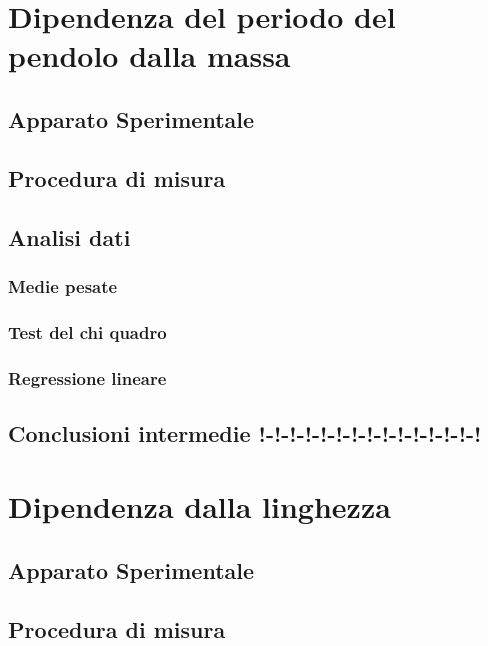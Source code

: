 \documentclass[11pt, twoside, a4paper]{article}
\begin{document}

\newpage

\newpage


\section{Dipendenza del periodo del pendolo dalla massa}
%
	\subsection{Apparato Sperimentale}
	
	\subsection{Procedura di misura}
	
	\subsection{Analisi dati}
		\subsubsection{Medie pesate}
		
		\subsubsection{Test del chi quadro}
		
		\subsubsection{Regressione lineare}
		
	\subsection{Conclusioni intermedie !-!-!-!-!-!-!-!-!-!-!-!-!-!-!}
	
\newpage
\section{Dipendenza dalla linghezza}
	\subsection{Apparato Sperimentale}
	
	\subsection{Procedura di misura}
	
\end{document}
